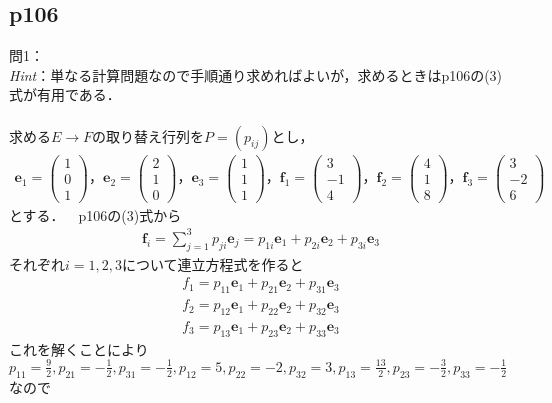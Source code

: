 \documentclass[dvipdfmx,uplatex,11pt]{jsarticle}
\theoremstyle{definition}
\begin{document}
\subsection{p106}
\noindent
問1：\\
\textsl{Hint}：単なる計算問題なので手順通り求めればよいが，求めるときはp106の(3)式が有用である．\\ \\
求める$E→F$の取り替え行列を$P=(p_{ij})$とし，
\begin{eqnarray*}
\bm{e}_1=
\begin{pmatrix}
1 \\
0 \\
1
\end{pmatrix}
，
\bm{e}_2=
\begin{pmatrix}
2 \\
1 \\
0
\end{pmatrix}
，
\bm{e}_3=
\begin{pmatrix}
1 \\
1 \\
1
\end{pmatrix}
，
\bm{f}_1=
\begin{pmatrix}
3 \\
-1 \\
4
\end{pmatrix}
，
\bm{f}_2=
\begin{pmatrix}
4 \\
1 \\
8
\end{pmatrix}
，
\bm{f}_3=
\begin{pmatrix}
3 \\
-2 \\
6
\end{pmatrix}
\end{eqnarray*}
とする．~~p106の(3)式から
\begin{eqnarray*}
\bm{f}_i=\sum^{3}_{j=1}p_{ji}\bm{e}_{j}=p_{1i}\bm{e}_1+p_{2i}\bm{e}_2+p_{3i}\bm{e}_3
\end{eqnarray*}
それぞれ$i=1,2,3$について連立方程式を作ると
\begin{eqnarray*}
f_1=p_{11}\bm{e}_1+p_{21}\bm{e}_2+p_{31}\bm{e}_3 \\
f_2=p_{12}\bm{e}_1+p_{22}\bm{e}_2+p_{32}\bm{e}_3 \\
f_3=p_{13}\bm{e}_1+p_{23}\bm{e}_2+p_{33}\bm{e}_3
\end{eqnarray*}
これを解くことにより$p_{11}=\frac{9}{2},p_{21}=-\frac{1}{2},p_{31}=-\frac{1}{2},p_{12}=5,p_{22}=-2,p_{32}=3,p_{13}=\frac{13}{2},p_{23}=-\frac{3}{2},p_{33}=-\frac{1}{2}$なので
\end{document}
